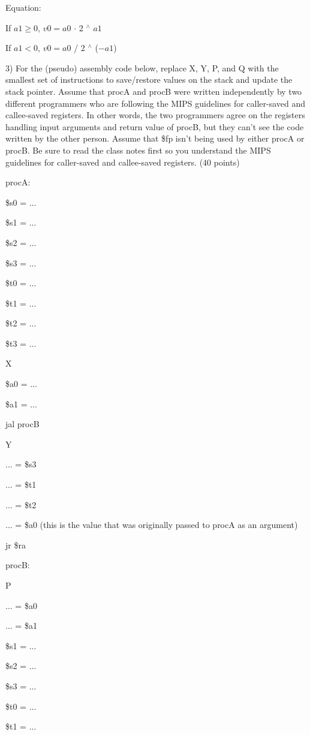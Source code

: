 \documentclass{article}
\begin{document}
Equation:

If $a1 \geq 0$, $v0 = a0$ $\cdot$ 2 $^\wedge$ $a1$

If $a1 < 0$, $v0 = a0$ / 2 $^\wedge$ ($-a1$)


\newpage

3)  For the (pseudo) assembly code below, replace X, Y, P, and Q
with the smallest set of instructions to save/restore values on
the stack and update the stack pointer. Assume that procA and
procB were written independently by two different programmers
who are following the MIPS guidelines for caller-saved and
callee-saved registers. In other words, the two programmers
agree on the registers handling input arguments and return
value of procB, but they can't see the code written by the
other person. Assume that \$fp isn't being used by either
procA or procB. Be sure to read the class notes first so
you understand the MIPS guidelines for caller-saved and
callee-saved registers. (40 points) 


procA:

    \$s0 = ...

    \$s1 = ...

    \$s2 = ...

    \$s3 = ...

    \$t0 = ...

    \$t1 = ...

    \$t2 = ...

    \$t3 = ...

    X

    \$a0 = ...

    \$a1 = ...

    jal procB

    Y

    ... = \$s3

    ... = \$t1

    ... = \$t2

    ... = \$a0 (this is the value that was originally passed to procA as an argument)

    jr \$ra

procB:

    P

    ... = \$a0

    ... = \$a1

    \$s1 = ...

    \$s2 = ...

    \$s3 = ...

    \$t0 = ...

    \$t1 = ...
\end{document}
